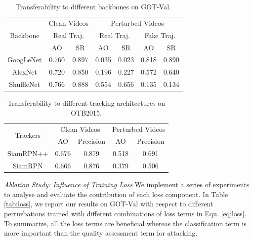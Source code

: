\documentclass[journal]{IEEEtran}
\begin{document}
\begin{table}
\centering
\caption{Transferability to different backbones on GOT-Val.}
\begin{tabular}{c|cc|cc|cc} 
\toprule
\multirow{3}{*}[-6pt]{Backbone} & \multicolumn{2}{c|}{Clean Videos}    & \multicolumn{4}{c}{Perturbed Videos}                                        \\ 
\cmidrule{2-7}
                          & \multicolumn{2}{c|}{Real Traj.} & \multicolumn{2}{c|}{Real Traj.} & \multicolumn{2}{c}{Fake Traj.}  \\ 
\cmidrule{2-7}
                          & AO    & SR                           & AO    & SR                           & AO    & SR                           \\ 
\midrule
GoogLeNet                 & 0.760 & 0.897                        & 0.035 & 0.023                        & 0.818 & 0.890                        \\
AlexNet                   & 0.720 & 0.850                        & 0.196 & 0.227                        & 0.572 & 0.640                        \\
ShuffleNet                & 0.766 & 0.888                        & 0.554 & 0.656                        & 0.135 & 0.134                        \\
\bottomrule
\end{tabular}
\label{tab:backbone}
\end{table}

\begin{table}
\centering
\caption{Transferability to different tracking architectures on OTB2015.}
\begin{tabular}{c|cc|cc} 
\toprule
\multirow{2}{*}[-2pt]{Trackers} & \multicolumn{2}{c|}{Clean Videos} & \multicolumn{2}{c}{Perturbed Videos}  \\
\cmidrule{2-5}
                          & AO & Precision              & AO & Precision                   \\
\midrule
SiamRPN++                 & 0.676   & 0.879                  & 0.518   & 0.691                       \\
SiamRPN                   & 0.666   & 0.876                  & 0.379   & 0.506                       \\
\bottomrule
\end{tabular}
\label{tab:arch}
\end{table}

\textit{Ablation Study: Influence of Training Loss} We implement a series of experiments to analyse and evaluate the contribution of each loss component.
In Table \ref{tab:loss}, we report our results on GOT-Val with respect to different perturbations trained with different combinations of loss terms in Equ. \ref{eq:loss}.
To summarize, all the loss terms are beneficial whereas the classification term is more important than the quality assessment term for attacking.
\end{document}
